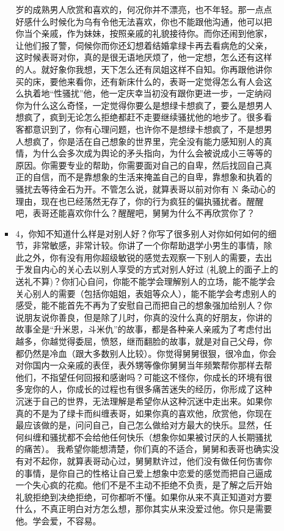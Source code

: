\documentclass[9pt, b5paper]{article}
\begin{document}
\begin{enumerate}
\begin{enumerate}
\begin{itemize}
岁的成熟男人欣赏和喜欢的，何况你并不漂亮，也不年轻。那一点点好感什么时候化为乌有令他无法喜欢，你也不能跟他沟通，他可以把你当个亲戚，作为妹妹，按照亲戚的礼貌接待你。而你还闹到他家，让他们报了警，伺候你而你还幻想着结婚拿绿卡再去看病危的父亲，这时候表哥对你，真的是很无语地厌烦了，他一定想，怎么还有这样的人。就好象你我想，天下怎么还有凤姐这样不自知。你再跟他讲你买的床，要他来看你，还有新床什么的，表哥一定觉得怎么有人会这么执着地“性骚扰”他，他一定庆幸当初没有跟你更进一步，一定纳闷你为什么这么奇怪，一定觉得你要么是想绿卡想疯了，要么是想男人想疯了，疯到无论怎么拒绝都赶不走要继续骚扰他的地步了。很多看客都意识到了，你有心理问题，也许你不是想绿卡想疯了，不是想男人想疯了，你是活在自己想象的世界里，完全没有能力感知别人的真情，为什么会多次成为舆论的矛头指向，为什么会被说成小三等等的原因。你需要专业的帮助，你需要面对自己的自卑，然后找回自己真正的自信，而不是靠想象的生活来掩盖自己的自卑，靠想象和执着的骚扰去等待金石为开。不管怎么说，就算表哥以前对你有 N 条动心的理由，现在也已经荡然无存了，你的行为疯狂的偏执骚扰者。醒醒吧，表哥还能喜欢你什么？醒醒吧，舅舅为什么不再欣赏你了？
\item 4，你知不知道什么样是对别人好？你写了很多别人对你如何如何的细节，非常敏感，非常计较。你讲了一个你帮助退学小男生的事情，除此之外，你有没有用你超级敏锐的感觉去观察一下别人的需要，去出于发自内心的关心去以别人享受的方式对别人好过 (礼貌上的面子上的送礼不算)？你扪心自问，你能不能学会理解别人的立场，能不能学会关心别人的需要（包括你姐姐，表姐等众人），能不能学会考虑别人的感受，能不能首先不再为了安慰自己而把自己的想象强加给别人？你说朋友说你善良，但是除了儿时，你真的没什么真的好朋友，你讲的故事全是“升米恩，斗米仇”的故事，都是各种亲人亲戚为了考虑付出越多，你越觉得委屈，愤怒，继而翻脸的故事，就是对自己父母，你都仍然是冷血（跟大多数别人比较）。你觉得舅舅很狠，很冷血，你会对你国内一众亲戚的表侄，表外甥等像你舅舅当年频繁帮你那样去帮他们，不指望任何回报和感谢吗？可能这不怪你，你成长的环境有很多宠你的人，你成长的过程也有很多痛苦迷失的经历，你形成了这种沉迷于自己的世界，无法理解是希望你从这种沉迷中走出来。如果你真的不是为了绿卡而纠缠表哥，如果你真的喜欢他，欣赏他，你现在最应该做的是，问问自己，自己怎么做给对方最大的快乐。显然，任何纠缠和骚扰都不会给他任何快乐（想象你如果被讨厌的人长期骚扰的痛苦）。 我希望你能想清楚，你们真的不适合，舅舅和表哥也确实没有对不起你，就算表哥动心过，舅舅默许过，他们没有做任何伤害你的事情，是你自己的性格让自己爱上想象中恋爱的感觉而把自己逼成一个失心疯的花痴。他们不是不主动不拒绝不负责，是了解之后开始礼貌拒绝到决绝拒绝，可你都听不懂。如果你从来不真正知道对方要什么，不真正明白对方怎么想，那你其实从来没爱过他。你只是需要他。学会爱，不容易。

\end{itemize}
\end{enumerate}
\end{enumerate}
\end{document}
